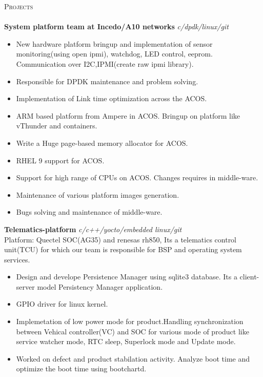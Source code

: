 \documentclass[a4paper]{article}
\newcommand{\lineunder} {
    \vspace*{-8pt} \\
    \hspace*{-18pt} \hrulefill \\
}
\newcommand{\header} [1] {
    {\hspace*{-18pt}\vspace*{6pt} \textsc{#1}}
    \vspace*{-6pt} \lineunder
}
\begin{document}
\header{Projects}
{\textbf{ System platform team at Incedo/A10 networks }} {\sl c/dpdk/linux/git} \\
\begin{itemize} \itemsep 0.5pt
	\item New hardware platform bringup and implementation of sensor monitoring(using open ipmi), watchdog, LED control, eeprom. Communication over I2C,IPMI(create raw ipmi library).
	\item Responsible for DPDK maintenance and problem solving.
	\item Implementation of Link time optimization across the ACOS.
	\item ARM based platform from Ampere in ACOS. Bringup on platform like vThunder and containers.
	\item Write a Huge page-based memory allocator for ACOS.
	\item RHEL 9 support for ACOS.
	\item Support for high range of CPUs on ACOS. Changes requires in middle-ware. 
	\item Maintenance of various platform images generation.
	\item Bugs solving and maintenance of middle-ware.
\end{itemize}
\vspace*{2mm}

{\textbf{Telematics-platform}} {\sl c/c++/yocto/embedded linux/git} \\
Platform: Quectel SOC(AG35) and renesas rh850, Its a telematics control unit(TCU) for which our team is responsible for BSP and operating system services.\\ 
\begin{itemize} \itemsep 0.5pt
\item Design and develope Persistence Manager using sqlite3 database. Its a client-server model Persistency Manager application.
\item GPIO driver for linux kernel.
\item Implemetation of low power mode for product.Handling synchronization between Vehical controller(VC) and SOC for various mode of product like service watcher mode, RTC sleep, Superlock mode and Update mode.
\item Worked on defect and product stabilation activity. Analyze boot time and optimize the boot time using bootchartd.
\end{itemize}
\vspace*{2mm}
\end{document}
